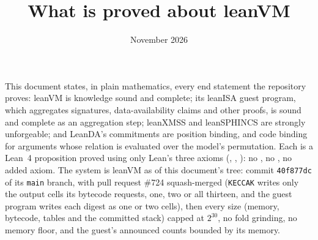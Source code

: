 \documentclass[11pt]{article}
\title{What is proved about leanVM}
\author{}
\date{November 2026}
\begin{document}
\maketitle

\noindent This document states, in plain mathematics, every end statement the repository proves:
leanVM is knowledge sound and complete; its leanISA guest program, which aggregates signatures,
data-availability claims and other proofs, is sound and complete as an aggregation step; leanXMSS
and leanSPHINCS are strongly unforgeable; and LeanDA's commitments are position binding, and code
binding for arguments whose relation is evaluated over the model's permutation. Each is a Lean~4
proposition proved using only Lean's three axioms (, ,
): no , no , no added axiom. The system is
leanVM as of this document's tree: commit \texttt{40f877dc} of its \texttt{main} branch, with pull request \#724 squash-merged
(\texttt{KECCAK} writes only the output cells its bytecode requests, one, two or all thirteen, and
the guest program writes each digest as one or two cells), then every size (memory, bytecode, tables and the committed stack) capped at $2^{30}$, no fold grinding, no memory floor, and the guest's announced counts bounded by its memory.
\end{document}
